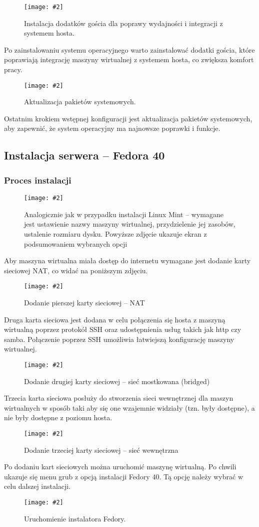 \documentclass[a4paper]{article}
\newcommand*{\zdj}[2][\textwidth]{\texttt{[image: \#2]}}
\newcommand*{\fg}[4][!htb]{
      \begin{figure*}[#1]
            \zdj{#2}
            \caption[#4]{#3}
      \end{figure*}
}
\begin{document}
\fg{contents/OS_installation/Linux_mint/9.png}{Instalacja dodatków gościa dla poprawy wydajności i integracji z systemem hosta.}{Instalacja dodatków gościa}

Po zainstalowaniu systemu operacyjnego warto zainstalować dodatki gościa, które poprawiają integrację maszyny wirtualnej z systemem hosta, co zwiększa komfort pracy.

\fg{contents/OS_installation/Linux_mint/10.png}{Aktualizacja pakietów systemowych.}{Aktualizacja pakietów}

Ostatnim krokiem wstępnej konfiguracji jest aktualizacja pakietów systemowych, aby zapewnić, że system operacyjny ma najnowsze poprawki i funkcje.
\newpage
\subsection{Instalacja serwera – Fedora 40}
\subsubsection{Proces instalacji}
\fg{contents/OS_installation/Fedora40/4.png}{Analogicznie jak w przypadku instalacji Linux Mint – wymagane jest ustawienie nazwy maszyny wirtualnej, przydzielenie jej zasobów, ustalenie rozmiaru dysku. Powyższe zdjęcie ukazuje ekran z podsumowaniem wybranych opcji}{Podsumowanie maszyny wirtualnej Fedora 40}
Aby maszyna wirtualna miała dostęp do internetu wymagane jest dodanie karty sieciowej NAT, co widać na poniższym zdjęciu.
\fg{contents/OS_installation/Fedora40/5.png}{Dodanie pierszej karty sieciowej – NAT}{Dodanie pierszej karty sieciowej}
\newpage
Druga karta sieciowa jest dodana w celu połączenia się hosta z maszyną wirtualną poprzez protokół SSH oraz udostępnienia usług takich jak http czy samba. Połączenie poprzez SSH umożliwia łatwiejszą konfigurację maszyny wirtualnej.
\fg{contents/OS_installation/Fedora40/6.png}{Dodanie drugiej karty sieciowej – sieć mostkowana (bridged)}{Dodanie drugiej karty sieciowej}

Trzecia karta sieciowa posłuży do stworzenia sieci wewnętrznej dla maszyn wirtualnych w sposób taki aby się one wzajemnie widziały (tzn. były dostępne), a nie były dostępne z poziomu hosta.
\fg{contents/OS_installation/Fedora40/7.png}{Dodanie trzeciej karty sieciowej – sieć wewnętrzna}{Dodanie trzeciej karty sieciowej}
\newpage
Po dodaniu kart sieciowych można uruchomić maszynę wirtualną. Po chwili ukazuje się menu grub z opcją instalacji Fedory 40. Tą opcję należy wybrać w celu dalszej instalacji.
\fg{contents/OS_installation/Fedora40/8.png}{Uruchomienie instalatora Fedory.}{Uruchomienie instalatora Fedory.}
\end{document}
